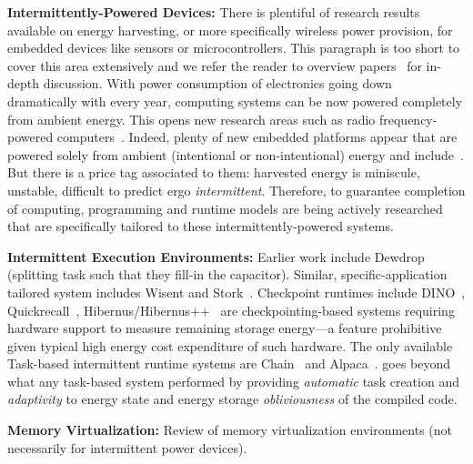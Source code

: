 \noindent \textbf{Intermittently-Powered Devices:} There is plentiful of research results available on energy harvesting, or more specifically wireless power provision, for embedded devices like sensors or microcontrollers. This paragraph is too short to cover this area extensively and we refer the reader to overview papers~\cite{prasad_comst_2014,sample_procieee_2013,huang:commag:2015,visser_procieee_2013,kamalinejad_commag_2015,ku_cst_2016} for in-depth discussion. With power consumption of electronics going down dramatically with every year, computing systems can be now powered completely from ambient energy. This opens new research areas such as radio frequency-powered computers~\cite{patel_pervasive_2017,rf_powered_computing_gollakota_2014}. Indeed, plenty of new embedded platforms appear that are powered solely from ambient (intentional or non-intentional) energy and include~\cite{wisp5,moo,zhao_rfid_2015,holleman_biocas_2008,thomas_jbcs_2012,naderiparizi_rfid_2015,rodriguez_tbcs_2015,liu_sigcomm_2013,kicksat,nadeau_naturebio_2017}. But there is a price tag associated to them: harvested energy is miniscule, unstable, difficult to predict ergo \emph{intermittent}. Therefore, to guarantee completion of computing, programming and runtime models are being actively researched that are specifically tailored to these intermittently-powered systems. 

\noindent \textbf{Intermittent Execution Environments:} Earlier work include Dewdrop~\cite{dewdrop} (splitting task such that they fill-in the capacitor). Similar, specific-application tailored system includes Wisent and Stork~\cite{stork,wisent}. Checkpoint runtimes include DINO~\cite{dino}, Quickrecall~\cite{quickrecall}, Hibernus/Hibernus++~\cite{hibernus,hibernusplusplus} are checkpointing-based systems requiring hardware support to measure remaining storage energy---a feature prohibitive given typical high energy cost expenditure of such hardware. The only available Task-based intermittent runtime systems are Chain~\cite{chain} and Alpaca~\cite{alpaca}. \sys goes beyond what any task-based system performed by providing \emph{automatic} task creation and \emph{adaptivity} to energy state and energy storage \emph{obliviousness} of the compiled code. 

\noindent \textbf{Memory Virtualization:} Review of memory virtualization environments (not necessarily for intermittent power devices). 